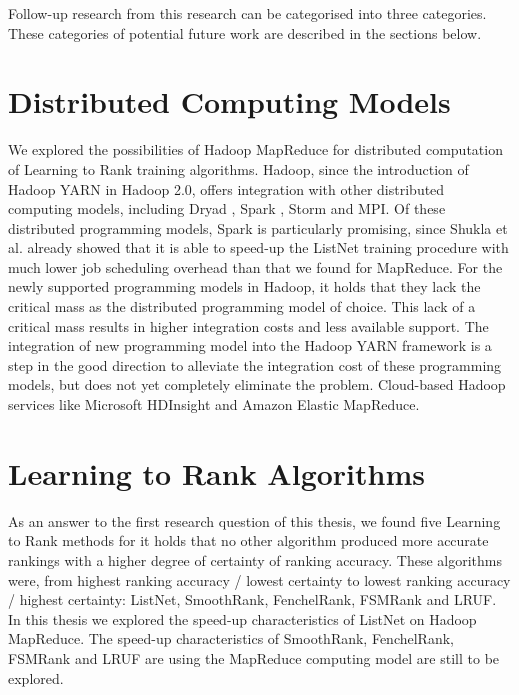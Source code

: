 Follow-up research from this research can be categorised into three categories. These categories of potential future work are described in the sections below.

\section{Distributed Computing Models}
We explored the possibilities of Hadoop MapReduce for distributed computation of Learning to Rank training algorithms. Hadoop, since the introduction of Hadoop YARN in Hadoop 2.0, offers integration with other distributed computing models, including Dryad \cite{Isard2007}, Spark \cite{Zaharia2010}, Storm \cite{Aniello2013} and \ac{MPI}. Of these distributed programming models, Spark is particularly promising, since Shukla et al. \cite{Shukla2012} already showed that it is able to speed-up the ListNet training procedure with much lower job scheduling overhead than that we found for MapReduce. For the newly supported programming models in Hadoop, it holds that they lack the critical mass as the distributed programming model of choice. This lack of a critical mass results in higher integration costs and less available support. The integration of new programming model into the Hadoop YARN framework is a step in the good direction to alleviate the integration cost of these programming models, but does not yet completely eliminate the problem. Cloud-based Hadoop services like Microsoft HDInsight and Amazon Elastic MapReduce.

\section{Learning to Rank Algorithms}
As an answer to the first research question of this thesis, we found five Learning to Rank methods for it holds that no other algorithm produced more accurate rankings with a higher degree of certainty of ranking accuracy. These algorithms were, from highest ranking accuracy / lowest certainty to lowest ranking accuracy / highest certainty: ListNet, SmoothRank, FenchelRank, FSMRank and LRUF. In this thesis we explored the speed-up characteristics of ListNet on Hadoop MapReduce. The speed-up characteristics of SmoothRank, FenchelRank, FSMRank and LRUF are using the MapReduce computing model are still to be explored.

